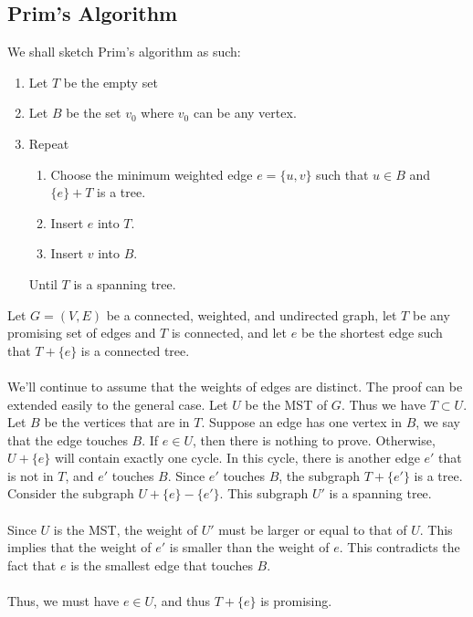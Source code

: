 \documentclass[a4paper]{article}
\begin{document}
\subsection{Prim's Algorithm}
We shall sketch Prim's algorithm as such:
\begin{enumerate}
	\item Let $T$ be the empty set
	\item Let $B$ be the set {$v_0$} where $v_0$ can be any vertex.
	\item Repeat
	\begin{enumerate}
		\item Choose the minimum weighted edge $e=\{u,v\}$ such that $u\in B$ and $\{e\} + T$ is a tree.
		\item Insert $e$ into $T$.
		\item Insert $v$ into $B$.
	\end{enumerate}
	Until $T$ is a spanning tree.
\end{enumerate}
Let $G=(V,E)$ be a connected, weighted, and undirected graph, let $T$ be any promising set of edges and $T$ is connected, and let $e$ be the shortest edge such that $T + \{e\}$ is a connected tree.\\\\
We'll continue to assume that the weights of edges are distinct. The proof can be extended easily to the general case. Let $U$ be the MST of $G$. Thus we have $T\subset U$. Let $B$ be the vertices that are in $T$. Suppose an edge has one vertex in $B$, we say that the edge touches $B$. If $e \in U$, then there is nothing to prove. Otherwise, $U + \{e\}$ will contain exactly one cycle. In this cycle, there is another edge $e'$ that is not in $T $, and $e'$ touches $B$. Since $e'$ touches $B$, the subgraph $T + \{e'\}$ is a tree. Consider the subgraph $U + \{e\} - \{e'\}$. This subgraph $U'$ is a spanning tree.\\\\
Since $U$ is the MST, the weight of $U'$ must be larger or equal to that of $U$. This implies that the weight of $e'$ is smaller than the weight of $e$. This contradicts the fact that $e$ is the smallest edge that touches $B$.\\\\
Thus, we must have $e\in U$, and thus $T + \{e\}$ is promising.
\end{document}
